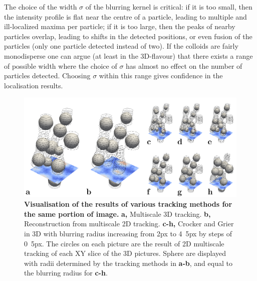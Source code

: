 \documentclass[prl,twocolumn,notitlepage]{revtex4-1}
\begin{document}
The choice of the width $\sigma$ of the blurring kernel is critical: if it is too small, then the intensity profile is flat near the centre  of a particle, leading to multiple and ill-localized maxima per particle; if it is too large, then the peaks of nearby particles overlap, leading to shifts in the detected positions, or even fusion of the particles (only one particle detected instead of two). If the colloids are fairly monodisperse one can argue (at least in the 3D-flavour) that there exists a range of possible width where the choice of $\sigma$ has almost no effect on the number of particles detected. Choosing $\sigma$ within this range gives confidence in the localisation results.

\begin{figure}
\begin{center}
\includegraphics{generate_figures-figure5.pdf}
\end{center}
\caption{\textbf{Visualisation of the results of various tracking methods for the same portion of image.} \textbf{a,} Multiscale 3D tracking. \textbf{b,} Reconstruction from multiscale 2D tracking. \textbf{c-h,} Crocker and Grier in 3D with blurring radius increasing from \unit{2}{px} to \unit{4.5}{px} by steps of \unit{0.5}{px}. The circles on each picture are the result of 2D multiscale tracking of each XY slice of the 3D pictures. Sphere are displayed with radii determined by the tracking methods in \textbf{a-b}, and equal to the blurring radius for \textbf{c-h}.}
	\label{fig:localise}
\end{figure}
\end{document}
